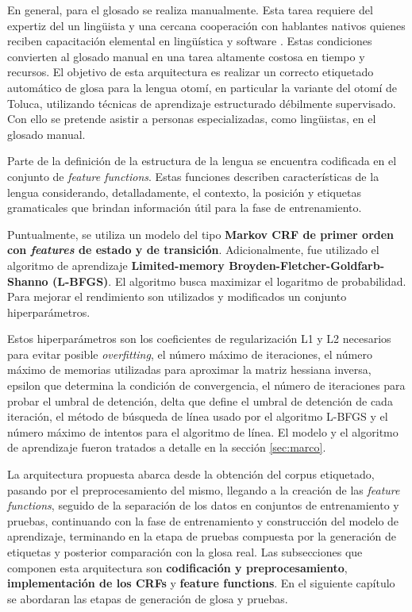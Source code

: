 \documentclass[letterpaper,12pt,oneside]{book}
\theoremstyle{definition}
\begin{document}
En general, para el glosado se realiza manualmente. Esta tarea requiere del expertiz del un lingüista y una cercana cooperación con hablantes nativos quienes reciben capacitación elemental en lingüística y software \citep{moeller2018automatic}. Estas condiciones convierten al glosado manual en una tarea altamente costosa en tiempo y recursos. El objetivo de esta arquitectura es realizar un correcto etiquetado automático de glosa para la lengua otomí, en particular la variante del otomí de Toluca, utilizando técnicas de aprendizaje estructurado débilmente supervisado. Con ello se pretende asistir a personas especializadas, como lingüistas, en el glosado manual.   

Parte de la definición de la estructura de la lengua se encuentra codificada en el conjunto de \textit{feature functions}. Estas funciones describen características de la lengua considerando, detalladamente, el contexto, la posición y etiquetas gramaticales que brindan información útil para la fase de entrenamiento.

Puntualmente, se utiliza un modelo del tipo \textbf{Markov CRF de primer orden con \textit{features} de estado y de transición}. Adicionalmente, fue utilizado el algoritmo de aprendizaje \textbf{Limited-memory Broyden-Fletcher-Goldfarb-Shanno (L-BFGS)}. El algoritmo busca maximizar el logaritmo de probabilidad. Para mejorar el rendimiento son utilizados y modificados un conjunto hiperparámetros.

Estos hiperparámetros son los coeficientes de regularización L1 y L2 necesarios para evitar posible \textit{overfitting}, el número máximo de iteraciones, el número máximo de memorias utilizadas para aproximar la matriz hessiana inversa, epsilon que determina la condición de convergencia, el número de iteraciones para probar el umbral de detención,  delta que define el umbral de detención de cada iteración, el método de búsqueda de línea usado por el algoritmo L-BFGS y el número máximo de intentos para el algoritmo de línea.
El modelo y el algoritmo de aprendizaje fueron tratados a detalle en la sección \ref{sec:marco}.

La arquitectura propuesta abarca desde la obtención del corpus etiquetado, pasando por el preprocesamiento del mismo, llegando a la creación de las \textit{feature functions}, seguido de la separación de los datos en conjuntos de entrenamiento y pruebas, continuando con la fase de entrenamiento y construcción del modelo de aprendizaje, terminando en la etapa de pruebas compuesta por la generación de etiquetas y posterior comparación con la glosa real. Las subsecciones que componen esta arquitectura son \textbf{codificación y preprocesamiento}, \textbf{implementación de los CRFs} y \textbf{feature functions}. En el siguiente capítulo se abordaran las etapas de generación de glosa y pruebas.
\end{document}
